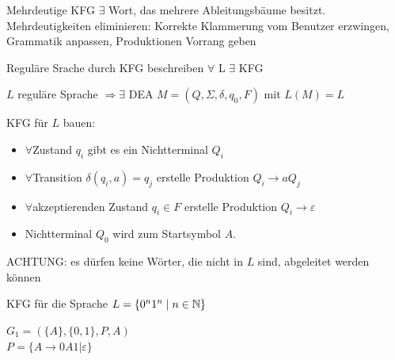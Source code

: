 \begin{concept}{Mehrdeutige KFG} $\exists $ Wort, das mehrere Ableitungsbäume besitzt.\\
    Mehrdeutigkeiten eliminieren: Korrekte Klammerung vom Benutzer erzwingen, Grammatik anpassen, Produktionen Vorrang geben
\end{concept}


\begin{KR}{Reguläre Srache durch KFG beschreiben} $\forall$ L $\exists$ KFG

    $L$ reguläre Sprache $\Rightarrow \exists$ DEA $M=\left(Q, \Sigma, \delta, q_{0}, F\right)$ mit $L(M)=L$
    
    \vspace*{1mm}

    KFG für $L$ bauen:
    \begin{itemize}
    \item $\forall$Zustand $q_{i}$ gibt es ein Nichtterminal $Q_{i}$
    \item $\forall$Transition $\delta\left(q_{i}, a\right)=q_{j}$ erstelle Produktion $Q_{i} \rightarrow a Q_{j}$
    \item $\forall$akzeptierenden Zustand $q_{i} \in F$ erstelle Produktion $Q_{i} \rightarrow \varepsilon$
    \item Nichtterminal $Q_{0}$ wird zum Startsymbol $A$.
    \end{itemize}
    ACHTUNG: es dürfen keine Wörter, die nicht in $L$ sind, abgeleitet werden können
\end{KR}

\begin{example2}{KFG für die Sprache} $L=\{0^{n} 1^{n} \mid n \in \mathbb{N}\}$
    
    $G_1 = (\{A\}, \{0,1\}, P, A)$\\
    $P = \{A \rightarrow 0 A 1 | \varepsilon\}$
\end{example2}

